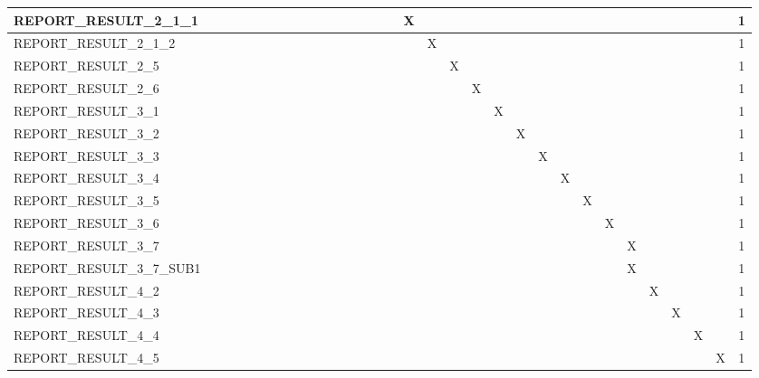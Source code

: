 \documentclass{cslthse-msc}
\begin{document}
\begin{appendices}
\begin{table}[H]
{\begin{tabular}{  l | c | c | c | c | c | c | c | c | c | c | c | c | c | c | c | c | c | c | c | c | c | c | c | c | c | c | c | c | c | c | c  }
	 REPORT\_RESULT\_2\_1\_1 &  &  &  &  &  &  &  &  &  &  &  &  &  &  &  & X &  &  &  &  &  &  &  &  &  &  &  &  &  &  & 1 \\ \hline
	 REPORT\_RESULT\_2\_1\_2 &  &  &  &  &  &  &  &  &  &  &  &  &  &  &  &  & X &  &  &  &  &  &  &  &  &  &  &  &  &  & 1 \\ \hline
	 REPORT\_RESULT\_2\_5 &  &  &  &  &  &  &  &  &  &  &  &  &  &  &  &  &  & X &  &  &  &  &  &  &  &  &  &  &  &  & 1 \\ \hline
	 REPORT\_RESULT\_2\_6 &  &  &  &  &  &  &  &  &  &  &  &  &  &  &  &  &  &  & X &  &  &  &  &  &  &  &  &  &  &  & 1 \\ \hline
	 REPORT\_RESULT\_3\_1 &  &  &  &  &  &  &  &  &  &  &  &  &  &  &  &  &  &  &  & X &  &  &  &  &  &  &  &  &  &  & 1 \\ \hline
	 REPORT\_RESULT\_3\_2 &  &  &  &  &  &  &  &  &  &  &  &  &  &  &  &  &  &  &  &  & X &  &  &  &  &  &  &  &  &  & 1 \\ \hline
	 REPORT\_RESULT\_3\_3 &  &  &  &  &  &  &  &  &  &  &  &  &  &  &  &  &  &  &  &  &  & X &  &  &  &  &  &  &  &  & 1 \\ \hline
	 REPORT\_RESULT\_3\_4 &  &  &  &  &  &  &  &  &  &  &  &  &  &  &  &  &  &  &  &  &  &  & X &  &  &  &  &  &  &  & 1 \\ \hline
	 REPORT\_RESULT\_3\_5 &  &  &  &  &  &  &  &  &  &  &  &  &  &  &  &  &  &  &  &  &  &  &  & X &  &  &  &  &  &  & 1 \\ \hline
	 REPORT\_RESULT\_3\_6 &  &  &  &  &  &  &  &  &  &  &  &  &  &  &  &  &  &  &  &  &  &  &  &  & X &  &  &  &  &  & 1 \\ \hline
	 REPORT\_RESULT\_3\_7 &  &  &  &  &  &  &  &  &  &  &  &  &  &  &  &  &  &  &  &  &  &  &  &  &  & X &  &  &  &  & 1 \\ \hline
	 REPORT\_RESULT\_3\_7\_SUB1 &  &  &  &  &  &  &  &  &  &  &  &  &  &  &  &  &  &  &  &  &  &  &  &  &  & X &  &  &  &  & 1 \\ \hline
	 REPORT\_RESULT\_4\_2 &  &  &  &  &  &  &  &  &  &  &  &  &  &  &  &  &  &  &  &  &  &  &  &  &  &  & X &  &  &  & 1 \\ \hline
	 REPORT\_RESULT\_4\_3 &  &  &  &  &  &  &  &  &  &  &  &  &  &  &  &  &  &  &  &  &  &  &  &  &  &  &  & X &  &  & 1 \\ \hline
	 REPORT\_RESULT\_4\_4 &  &  &  &  &  &  &  &  &  &  &  &  &  &  &  &  &  &  &  &  &  &  &  &  &  &  &  &  & X &  & 1 \\ \hline
	 REPORT\_RESULT\_4\_5 &  &  &  &  &  &  &  &  &  &  &  &  &  &  &  &  &  &  &  &  &  &  &  &  &  &  &  &  &  & X & 1 \\ \hline

\end{tabular}}
\end{table}
\end{appendices}
\end{document}
